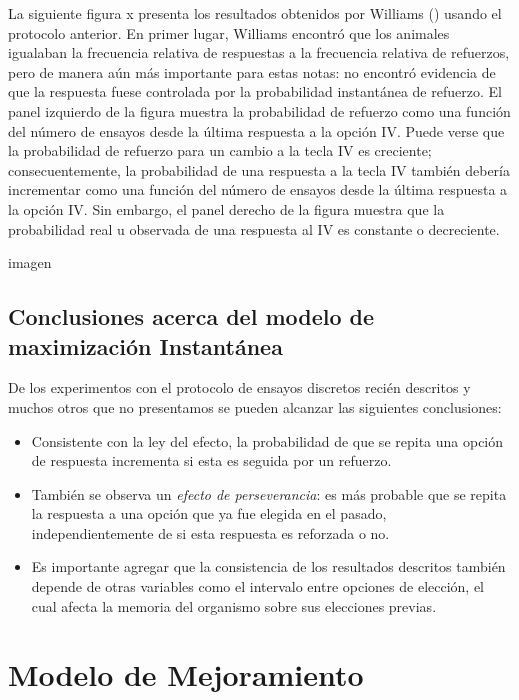 \documentclass[
  a4paper,
  DIV=11,
  numbers=noendperiod]{scrreprt}
\providecommand{\tightlist}{%
  \setlength{\itemsep}{0pt}\setlength{\parskip}{0pt}}\usepackage{longtable,booktabs,array}
\begin{document}
La siguiente figura x presenta los resultados obtenidos por Williams ()
usando el protocolo anterior. En primer lugar, Williams encontró que los
animales igualaban la frecuencia relativa de respuestas a la frecuencia
relativa de refuerzos, pero de manera aún más importante para estas
notas: no encontró evidencia de que la respuesta fuese controlada por la
probabilidad instantánea de refuerzo. El panel izquierdo de la figura
muestra la probabilidad de refuerzo como una función del número de
ensayos desde la última respuesta a la opción IV. Puede verse que la
probabilidad de refuerzo para un cambio a la tecla IV es creciente;
consecuentemente, la probabilidad de una respuesta a la tecla IV también
debería incrementar como una función del número de ensayos desde la
última respuesta a la opción IV. Sin embargo, el panel derecho de la
figura muestra que la probabilidad real u observada de una respuesta al
IV es constante o decreciente.

imagen

\subsection{Conclusiones acerca del modelo de maximización
Instantánea}\label{conclusiones-acerca-del-modelo-de-maximizaciuxf3n-instantuxe1nea}

De los experimentos con el protocolo de ensayos discretos recién
descritos y muchos otros que no presentamos se pueden alcanzar las
siguientes conclusiones:

\begin{itemize}
\tightlist
\item
  Consistente con la ley del efecto, la probabilidad de que se repita
  una opción de respuesta incrementa si esta es seguida por un refuerzo.
\item
  También se observa un \emph{efecto de perseverancia}: es más probable
  que se repita la respuesta a una opción que ya fue elegida en el
  pasado, independientemente de si esta respuesta es reforzada o no.
\item
  Es importante agregar que la consistencia de los resultados descritos
  también depende de otras variables como el intervalo entre opciones de
  elección, el cual afecta la memoria del organismo sobre sus elecciones
  previas.
\end{itemize}

\section{Modelo de Mejoramiento}\label{modelo-de-mejoramiento}
\end{document}
